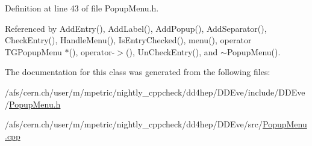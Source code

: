 Definition at line 43 of file PopupMenu.h.

Referenced by AddEntry(), AddLabel(), AddPopup(), AddSeparator(), CheckEntry(), HandleMenu(), IsEntryChecked(), menu(), operator TGPopupMenu $\ast$(), operator-\/$>$(), UnCheckEntry(), and $\sim$PopupMenu().

The documentation for this class was generated from the following files:\begin{DoxyCompactItemize}
\item 
/afs/cern.ch/user/m/mpetric/nightly\_\-cppcheck/dd4hep/DDEve/include/DDEve/\hyperlink{_popup_menu_8h}{PopupMenu.h}\item 
/afs/cern.ch/user/m/mpetric/nightly\_\-cppcheck/dd4hep/DDEve/src/\hyperlink{_popup_menu_8cpp}{PopupMenu.cpp}\end{DoxyCompactItemize}
